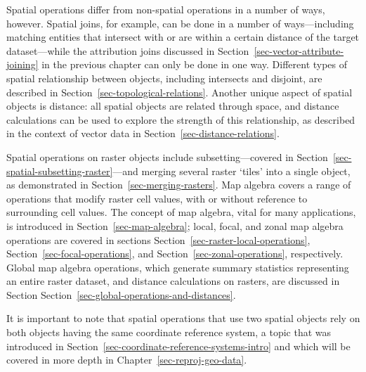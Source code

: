 \documentclass[
  letterpaper,
]{krantz}
\begin{document}
Spatial operations differ from non-spatial operations in a number of
ways, however. Spatial joins, for example, can be done in a number of
ways---including matching entities that intersect with or are within a
certain distance of the target dataset---while the attribution joins
discussed in Section~\ref{sec-vector-attribute-joining} in the previous
chapter can only be done in one way. Different types of spatial
relationship between objects, including intersects and disjoint, are
described in Section~\ref{sec-topological-relations}. Another unique
aspect of spatial objects is distance: all spatial objects are related
through space, and distance calculations can be used to explore the
strength of this relationship, as described in the context of vector
data in Section~\ref{sec-distance-relations}.

Spatial operations on raster objects include subsetting---covered in
Section~\ref{sec-spatial-subsetting-raster}---and merging several raster
`tiles' into a single object, as demonstrated in
Section~\ref{sec-merging-rasters}. Map algebra covers a range of
operations that modify raster cell values, with or without reference to
surrounding cell values. The concept of map algebra, vital for many
applications, is introduced in Section~\ref{sec-map-algebra}; local,
focal, and zonal map algebra operations are covered in sections
Section~\ref{sec-raster-local-operations},
Section~\ref{sec-focal-operations}, and
Section~\ref{sec-zonal-operations}, respectively. Global map algebra
operations, which generate summary statistics representing an entire
raster dataset, and distance calculations on rasters, are discussed in
Section Section~\ref{sec-global-operations-and-distances}.

\begin{tcolorbox}[enhanced jigsaw, title=\textcolor{quarto-callout-note-color}{\faInfo}\hspace{0.5em}{Note}, arc=.35mm, toprule=.15mm, titlerule=0mm, colframe=quarto-callout-note-color-frame, breakable, toptitle=1mm, bottomtitle=1mm, rightrule=.15mm, colbacktitle=quarto-callout-note-color!10!white, leftrule=.75mm, left=2mm, bottomrule=.15mm, opacityback=0, coltitle=black, opacitybacktitle=0.6, colback=white]

It is important to note that spatial operations that use two spatial
objects rely on both objects having the same coordinate reference
system, a topic that was introduced in
Section~\ref{sec-coordinate-reference-systems-intro} and which will be
covered in more depth in Chapter~\ref{sec-reproj-geo-data}.

\end{tcolorbox}
\end{document}
